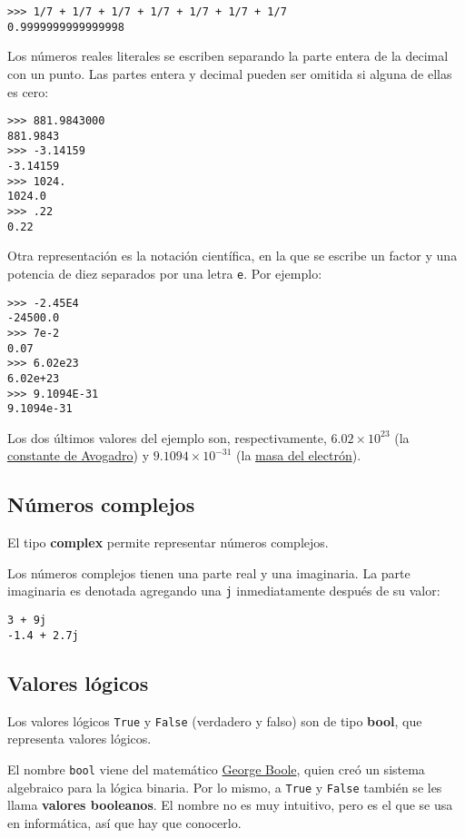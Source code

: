 \begin{lstlisting}
>>> 1/7 + 1/7 + 1/7 + 1/7 + 1/7 + 1/7 + 1/7
0.9999999999999998
\end{lstlisting}

Los números reales literales se escriben separando la parte entera de la
decimal con un punto. Las partes entera y decimal pueden ser omitida si
alguna de ellas es cero:

\begin{lstlisting}
>>> 881.9843000
881.9843
>>> -3.14159
-3.14159
>>> 1024.
1024.0
>>> .22
0.22
\end{lstlisting}

Otra representación es la notación científica, en la que se escribe un
factor y una potencia de diez separados por una letra \lstinline!e!. Por
ejemplo:

\begin{lstlisting}
>>> -2.45E4
-24500.0
>>> 7e-2
0.07
>>> 6.02e23
6.02e+23
>>> 9.1094E-31
9.1094e-31
\end{lstlisting}

Los dos últimos valores del ejemplo son, respectivamente,
$6.02\times 10^{23}$ (la
\href{http://es.wikipedia.org/wiki/Constante\_de\_Avogadro}{constante de
Avogadro}) y $9.1094\times 10^{-31}$ (la
\href{http://es.wikipedia.org/wiki/Electr\%C3\%B3n\#Propiedades}{masa
del electrón}).

\subsection{Números complejos}

El tipo \textbf{complex} permite representar números complejos.

Los números complejos tienen una parte real y una imaginaria. La parte
imaginaria es denotada agregando una \lstinline!j! inmediatamente
después de su valor:

\begin{lstlisting}
3 + 9j
-1.4 + 2.7j
\end{lstlisting}

\subsection{Valores lógicos}

Los valores lógicos \lstinline!True! y \lstinline!False! (verdadero y
falso) son de tipo \textbf{bool}, que representa valores lógicos.

El nombre \lstinline!bool! viene del matemático
\href{http://es.wikipedia.org/wiki/George\_Boole}{George Boole}, quien
creó un sistema algebraico para la lógica binaria. Por lo mismo, a
\lstinline!True! y \lstinline!False! también se les llama
\textbf{valores booleanos}. El nombre no es muy intuitivo, pero es el
que se usa en informática, así que hay que conocerlo.

